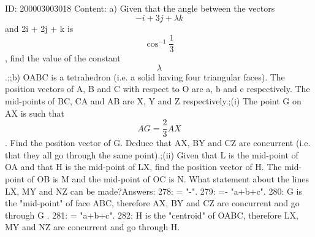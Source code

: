 \documentclass{article}
\begin{document}
ID: 200003003018
Content:
a) Given that the angle between the vectors \[-i + 3j + \lambda k\] and 2i + 2j + k is \[\cos^{-1} \frac{1}{3}\], find the value of the constant \[\lambda\].;;b) OABC is a tetrahedron (i.e. a solid having four triangular faces). The position vectors of A, B and C with respect to O are a, b and c respectively. The mid-points of BC, CA and AB are X, Y and Z respectively.;(i) The point G on AX is such that \[AG = \frac{2}{3} AX\]. Find the position vector of G. Deduce that AX, BY and CZ are concurrent (i.e. that they all go through the same point).;(ii) Given that L is the mid-point of OA and that H is the mid-point of LX, find the position vector of H. The mid-point of OB is M and the mid-point of OC is N. What statement about the lines LX, MY and NZ can be made?Answers:
278: \lambda = "-".
279:  =- "a+b+c".
280: G is the "mid-point" of face ABC, therefore AX, BY and CZ are concurrent and go through G .
281:  = "a+b+c".
282: H is the "centroid" of OABC, therefore LX, MY and NZ are concurrent and go through H.
\end{document}
